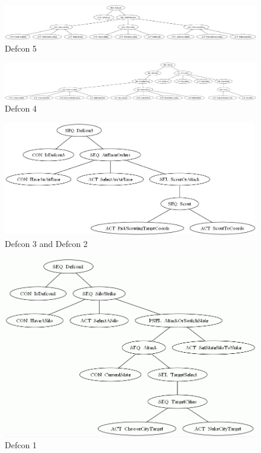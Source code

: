     \begin{figure}[h]
        \begin{center}
        \includegraphics[scale=0.2, angle=270]{images/defcon5r.png}
        \caption{Defcon 5}        
        \end{center} 
    \end{figure}
    
    \begin{figure}[h]
        \begin{center}
        \includegraphics[scale=0.2, angle=270]{images/defcon4r.png}
        \caption{Defcon 4}  
        \label{app:d4}
        \end{center} 
    \end{figure}
    
    \begin{figure}[h]
        \begin{center}
        \includegraphics[scale=0.4]{images/defcon3r.png}
        \caption{ Defcon 3 and Defcon 2} 
        \end{center} 
    \end{figure}
    
    \begin{figure}[h]
        \begin{center}
        \includegraphics[scale=0.4]{images/defcon1r.png}
        \caption{Defcon 1}        
        \end{center} 
    \end{figure}
